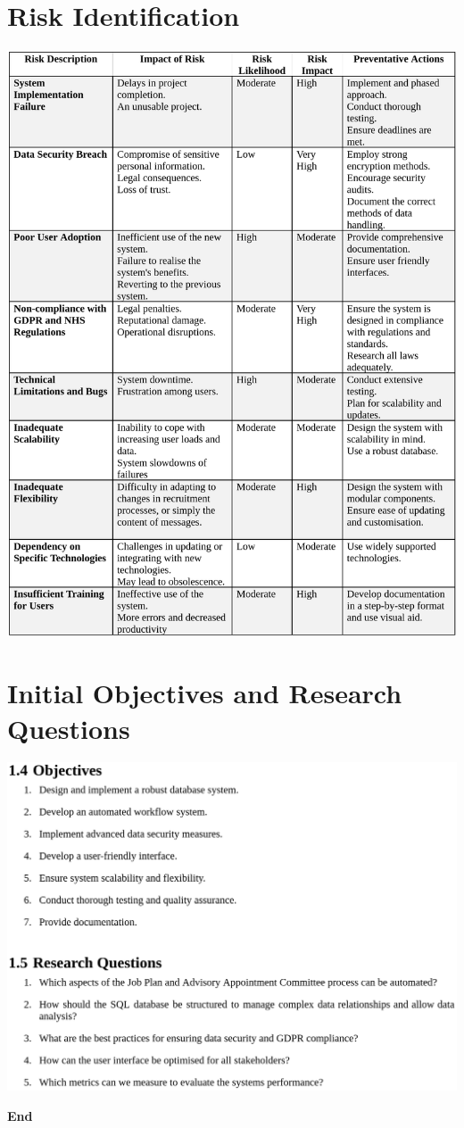 \begin{appendices}
\section{Risk Identification}
\includegraphics[width=\textwidth]{images/risk-analysis.png}

\section{Initial Objectives and Research Questions}
\includegraphics[width=\textwidth]{images/objectives-research.png}

\end{appendices}
\newpage
\thispagestyle{empty}
\mbox{}
\vfill
\begin{center}
\Huge{\textbf{End}}
\end{center}